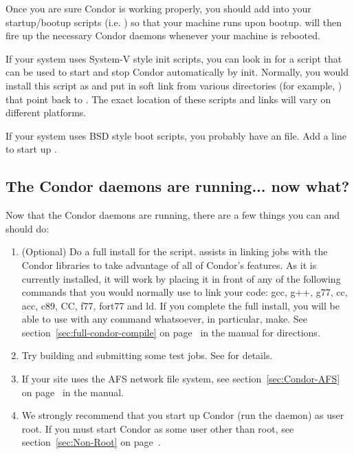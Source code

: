 Once you are sure Condor is working properly, you should add
 into your startup/bootup scripts (i.e.  ) so
that your machine runs  upon bootup.  
will then fire up the necessary Condor daemons whenever your machine
is rebooted.  

If your system uses System-V style init scripts, you can look in
 for a script that can be used
to start and stop Condor automatically by init.  Normally, you would
install this script as  and put in soft link from
various directories (for example, ) that point back to
.  The exact location of these scripts and links
will vary on different platforms.

If your system uses BSD style boot scripts, you probably have an
 file.  Add a line to start up
.


\subsection{\label{sec:Running-Now-What}The Condor daemons are
running... now what?} 

Now that the Condor daemons are running, there are a few things you
can and should do:

\begin{enumerate}
\item (Optional) Do a full install for the  script.
     assists in linking jobs with the Condor libraries
    to take advantage of all of Condor's features.  As it is currently
    installed, it will work by placing it in front of any of the
    following commands that you would normally use to link your code:
    gcc, g++, g77, cc, acc, c89, CC, f77, fort77 and ld.  If you
    complete the full install, you will be able to use
     with any command whatsoever, in particular, make.
    See section~\ref{sec:full-condor-compile} on
    page~\pageref{sec:full-condor-compile} in the manual for
    directions.

\item Try building and submitting some test jobs.  See
     for details.

\item If your site uses the AFS network file system, see
section~\ref{sec:Condor-AFS} on page~\pageref{sec:Condor-AFS} in the
manual.

\item We strongly recommend that you start up Condor (run the
 daemon) as user root.  If you must start Condor as
some user other than root, see section~\ref{sec:Non-Root} on
page~\pageref{sec:Non-Root}.

\end{enumerate}
